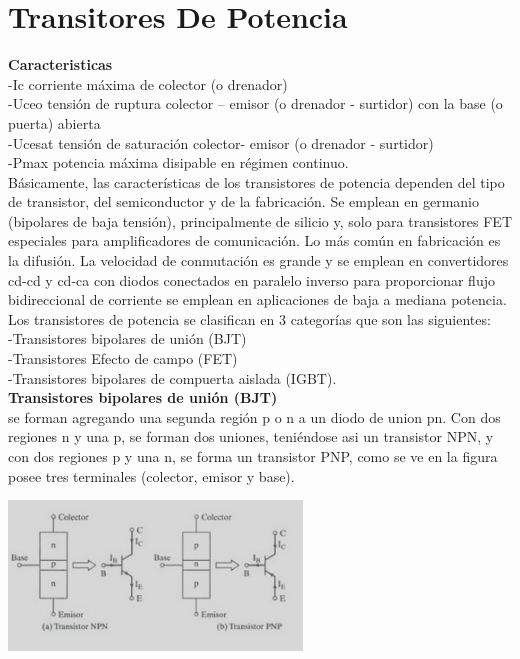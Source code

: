 \documentclass[10pt,a4paper]{article}
\begin{document}
\section{Transitores De Potencia}
\textbf{Caracteristicas}\\
-Ic corriente máxima de colector (o drenador)\\
-Uceo tensión de ruptura colector – emisor (o drenador  - surtidor) con la base (o puerta) abierta\\
-Ucesat  tensión de saturación colector- emisor (o drenador  - surtidor)\\
-Pmax  potencia máxima disipable en régimen continuo.\\
Básicamente, las características de los transistores de potencia dependen del tipo de transistor, del semiconductor y de la fabricación. Se emplean en germanio (bipolares de baja tensión), principalmente de silicio y, solo para transistores FET especiales para amplificadores de comunicación. Lo más común en fabricación es la difusión. La velocidad de conmutación es grande y se emplean en convertidores cd-cd y cd-ca con diodos conectados en paralelo inverso para proporcionar flujo bidireccional de corriente se emplean en aplicaciones de baja a mediana potencia.\\
Los transistores de potencia se clasifican en 3 categorías que son las siguientes:\\
-Transistores bipolares de unión (BJT)\\
-Transistores  Efecto de campo (FET)\\
-Transistores bipolares de compuerta aislada  (IGBT).\\
\textbf{Transistores bipolares de unión (BJT)}\\
se forman agregando una segunda región p o n a un diodo de union pn. Con dos regiones n y una p, se forman dos uniones, teniéndose asi un transistor NPN, y con dos regiones p  y una n, se forma un transistor PNP, como se ve en la figura posee tres terminales (colector,  emisor y base).\\

\begin{center}
\includegraphics[scale=0.8]{1.png}
\end{center} 
\end{document}
